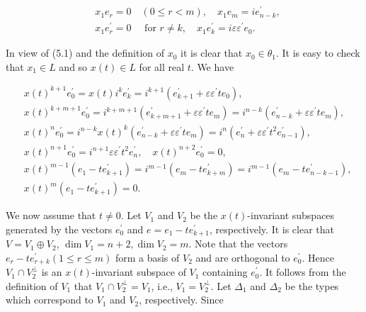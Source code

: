 \documentclass[10pt]{article}
\begin{document}
$$
\begin{aligned}
& x_{1} e_{r}=0 \quad(0 \leqslant r<m), \quad x_{1} e_{m}=i e_{n-k}^{\prime}, \\
& x_{1} e_{r}^{\prime}=0 \quad \text { for } r \neq k, \quad x_{1} e_{k}^{\prime}=i \varepsilon \varepsilon^{\prime} e_{0} .
\end{aligned}
$$

In view of (5.1) and the definition of $x_{0}$ it is clear that $x_{0} \in \theta_{1}$. It is easy to check that $x_{1} \in L$ and so $x(t) \in L$ for all real $t$. We have

$$
\begin{aligned}
& x(t)^{k+1} e_{0}^{\prime}=x(t) i^{k} e_{k}^{\prime}=i^{k+1}\left(e_{k+1}^{\prime}+\varepsilon \varepsilon^{\prime} t e_{0}\right), \\
& x(t)^{k+m+1} e_{0}^{\prime}=i^{k+m+1}\left(e_{k+m+1}^{\prime}+\varepsilon \varepsilon^{\prime} t e_{m}\right)=i^{n-k}\left(e_{n-k}^{\prime}+\varepsilon \varepsilon^{\prime} t e_{m}\right), \\
& x(t)^{n} e_{0}^{\prime}=i^{n-k} x(t)^{k}\left(e_{n-k}^{\prime}+\varepsilon \varepsilon^{\prime} t e_{m}\right)=i^{n}\left(e_{n}^{\prime}+\varepsilon \varepsilon^{\prime} t^{2} e_{n-1}^{\prime}\right), \\
& x(t)^{n+1} e_{0}^{\prime}=i^{n+1} \varepsilon \varepsilon^{\prime} t^{2} e_{n}^{\prime}, \quad x(t)^{n+2} e_{0}^{\prime}=0, \\
& x(t)^{m-1}\left(e_{1}-t e_{k+1}^{\prime}\right)=i^{m-1}\left(e_{m}-t e_{k+m}^{\prime}\right)=i^{m-1}\left(e_{m}-t e_{n-k-1}^{\prime}\right), \\
& x(t)^{m}\left(e_{1}-t e_{k+1}^{\prime}\right)=0 .
\end{aligned}
$$

We now assume that $t \neq 0$. Let $V_{1}$ and $V_{2}$ be the $x(t)$-invariant subspaces generated by the vectors $e_{0}^{\prime}$ and $e=e_{1}-t e_{k+1}^{\prime}$, respectively. It is clear that $V=V_{1} \oplus V_{2}$, $\operatorname{dim} V_{1}=n+2, \operatorname{dim} V_{2}=m$. Note that the vectors $e_{r}-t e_{r+k}^{\prime}(1 \leqslant r \leqslant m)$ form a basis of $V_{2}$ and are orthogonal to $e_{0}^{\prime}$. Hence $V_{1} \cap V_{2}^{\perp}$ is an $x(t)$-invariant subspace of $V_{1}$ containing $e_{0}^{\prime}$. It follows from the definition of $V_{1}$ that $V_{1} \cap V_{2}^{\perp}=V_{1}$, i.e., $V_{1}=V_{2}^{\perp}$. Let $\Delta_{1}$ and $\Delta_{2}$ be the types which correspond to $V_{1}$ and $V_{2}$, respectively. Since
\end{document}
